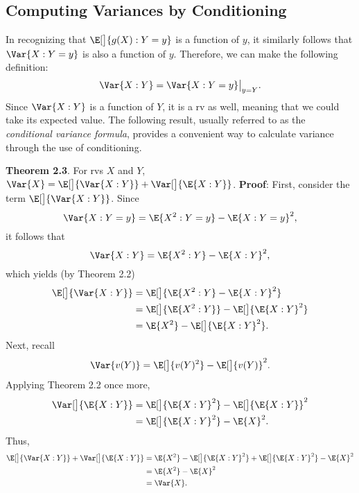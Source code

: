 \subsection*{Computing Variances by Conditioning}
\begin{Regular}{}
    In recognizing that $ \E[\big]{g(X)\given Y=y} $ is a function of $ y $, it similarly
    follows that $ \Var{X\given Y=y} $ is also a function of $ y $. Therefore, we can make the
    following definition:
    \[ \Var{X\given Y}=\Var{X\given Y=y}\bigr\rvert_{y=Y}. \]
    Since $ \Var{X\given Y} $ is a function of $ Y $, it is a rv as well, meaning that we could take its expected
    value. The following result, usually referred to as the \emph{conditional variance formula}, provides a
    convenient way to calculate variance through the use of conditioning.
\end{Regular}
\begin{Result}{}
    \textbf{Theorem 2.3}. For rvs $ X $ and $ Y $, $ \Var{X}=\E[\big]{\Var{X\given Y}}+\Var[\big]{\E{X\given Y}} $.
    \tcblower{}
    \textbf{Proof}: First, consider the term $ \E[\big]{\Var{X\given Y}} $. Since
    \[ \Var{X\given Y=y}=\E{X^2\given Y=y}-\E{X\given Y=y}^2, \]
    it follows that
    \[ \Var{X\given Y}=\E{X^2\given Y}-\E{X\given Y}^2, \]
    which yields (by Theorem 2.2)
    \begin{align*}
        \E[\big]{\Var{X\given Y}}
         & =\E[\big]{\E{X^2\given Y}-\E{X\given Y}^2}           \\
         & =\E[\big]{\E{X^2\given Y}}-\E[\big]{\E{X\given Y}^2} \\
         & =\E{X^2}-\E[\big]{\E{X\given Y}^2}.
    \end{align*}
    Next, recall
    \[ \Var{v(Y)}=\E[\big]{v(Y)^2}-\E[\big]{v(Y)}^2. \]
    Applying Theorem 2.2 once more,
    \begin{align*}
        \Var[\big]{\E{X\given Y}}
         & =\E[\big]{\E{X\given Y}^2}-\E[\big]{\E{X\given Y}}^2 \\
         & =\E[\big]{\E{X\given Y}^2}-\E{X}^2.
    \end{align*}
    Thus,
    \begin{align*}
        \E[\big]{\Var{X\given Y}}+\Var[\big]{\E{X\given Y}}
         & =\E{X^2}-\E[\big]{\E{X\given Y}^2}+\E[\big]{\E{X\given Y}^2}-\E{X}^2 \\
         & =\E{X^2}-\E{X}^2                                                     \\
         & =\Var{X}.
    \end{align*}
\end{Result}
